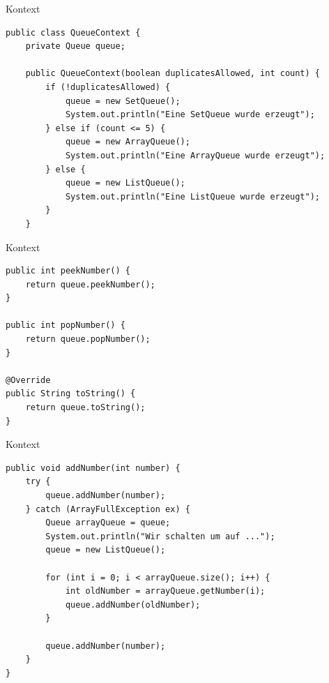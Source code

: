 \begin{frame}[fragile]{Kontext}
	\begin{exampleblock}{}
        \begin{lstlisting}
public class QueueContext {
	private Queue queue;
	
	public QueueContext(boolean duplicatesAllowed, int count) {
		if (!duplicatesAllowed) {
			queue = new SetQueue();
			System.out.println("Eine SetQueue wurde erzeugt");
		} else if (count <= 5) {
			queue = new ArrayQueue();
			System.out.println("Eine ArrayQueue wurde erzeugt");
		} else {
			queue = new ListQueue();
			System.out.println("Eine ListQueue wurde erzeugt");
		}
	}
        \end{lstlisting}
 	\end{exampleblock}
\end{frame}

\begin{frame}[fragile]{Kontext}
	\begin{exampleblock}{}
        \begin{lstlisting}
public int peekNumber() {
    return queue.peekNumber();
}

public int popNumber() {
    return queue.popNumber();
}

@Override
public String toString() {
    return queue.toString();
}
        \end{lstlisting}
 	\end{exampleblock}
\end{frame}

\begin{frame}[fragile]{Kontext}
	\begin{exampleblock}{}
        \begin{lstlisting}
public void addNumber(int number) {
    try {
        queue.addNumber(number);
    } catch (ArrayFullException ex) {
        Queue arrayQueue = queue;
        System.out.println("Wir schalten um auf ...");
        queue = new ListQueue();
        
        for (int i = 0; i < arrayQueue.size(); i++) {
            int oldNumber = arrayQueue.getNumber(i);
            queue.addNumber(oldNumber);
        }
        
        queue.addNumber(number);
    }
}
        \end{lstlisting}
 	\end{exampleblock}
\end{frame}

